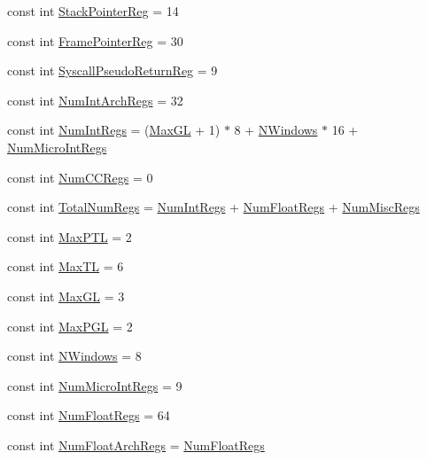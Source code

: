 \begin{DoxyCompactItemize}
\item 
const int \hyperlink{namespaceSparcISA_a95d0846360ad0e64cb42fda7268a6434}{StackPointerReg} = 14
\item 
const int \hyperlink{namespaceSparcISA_aabd6fa5889c9ccc124dfd4a984046f6f}{FramePointerReg} = 30
\item 
const int \hyperlink{namespaceSparcISA_ab566b6da98edbb32e80291edaf0906ba}{SyscallPseudoReturnReg} = 9
\item 
const int \hyperlink{namespaceSparcISA_a405c0abe85dc0da846c120e3b31f375c}{NumIntArchRegs} = 32
\item 
const int \hyperlink{namespaceSparcISA_a9c412b5118ce369570c156c4e156638a}{NumIntRegs} = (\hyperlink{namespaceSparcISA_af56470bc16dfc33549217225934bcd23}{MaxGL} + 1) $\ast$ 8 + \hyperlink{namespaceSparcISA_a6216686abfee3750d491873b95a05308}{NWindows} $\ast$ 16 + \hyperlink{namespaceSparcISA_a985912475a96ec00a4ff48b39004d43a}{NumMicroIntRegs}
\item 
const int \hyperlink{namespaceSparcISA_a717317b863009b3e1b683c3bdddb9fd3}{NumCCRegs} = 0
\item 
const int \hyperlink{namespaceSparcISA_a578a3508d56f10e933ba9559e2cf907c}{TotalNumRegs} = \hyperlink{namespaceSparcISA_a9c412b5118ce369570c156c4e156638a}{NumIntRegs} + \hyperlink{namespaceSparcISA_a627b25288f2452be107872a138df8b85}{NumFloatRegs} + \hyperlink{namespaceSparcISA_a568d4aa96dd7cd963f3b1b1b0446c9c6}{NumMiscRegs}
\item 
const int \hyperlink{namespaceSparcISA_adcffeac928f8e9f6b317518b5f789181}{MaxPTL} = 2
\item 
const int \hyperlink{namespaceSparcISA_a8d6a6b2e04f9b3ebcec03466060ff24a}{MaxTL} = 6
\item 
const int \hyperlink{namespaceSparcISA_af56470bc16dfc33549217225934bcd23}{MaxGL} = 3
\item 
const int \hyperlink{namespaceSparcISA_a1a64618a48f1b54d7c50a02b322cba4c}{MaxPGL} = 2
\item 
const int \hyperlink{namespaceSparcISA_a6216686abfee3750d491873b95a05308}{NWindows} = 8
\item 
const int \hyperlink{namespaceSparcISA_a985912475a96ec00a4ff48b39004d43a}{NumMicroIntRegs} = 9
\item 
const int \hyperlink{namespaceSparcISA_a627b25288f2452be107872a138df8b85}{NumFloatRegs} = 64
\item 
const int \hyperlink{namespaceSparcISA_a9ec947def3616ab9415089776195fa09}{NumFloatArchRegs} = \hyperlink{namespaceSparcISA_a627b25288f2452be107872a138df8b85}{NumFloatRegs}
\end{DoxyCompactItemize}


